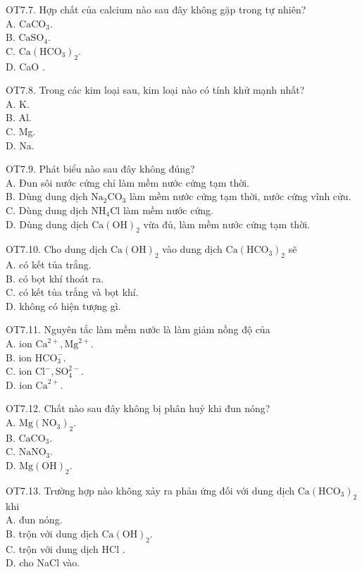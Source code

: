\documentclass[10pt]{article}
\begin{document}
OT7.7. Hợp chất của calcium nào sau đây không gặp trong tự nhiên?\\
A. $\mathrm{CaCO}_{3}$.\\
B. $\mathrm{CaSO}_{4}$.\\
C. $\mathrm{Ca}\left(\mathrm{HCO}_{3}\right)_{2}$.\\
D. CaO .

OT7.8. Trong các kim loại sau, kim loại nào có tính khử mạnh nhất?\\
A. K.\\
B. Al.\\
C. Mg.\\
D. Na.

OT7.9. Phát biểu nào sau đây không đúng?\\
A. Đun sôi nước cứng chỉ làm mềm nước cứng tạm thời.\\
B. Dùng dung dịch $\mathrm{Na}_{2} \mathrm{CO}_{3}$ làm mềm nước cứng tạm thời, nước cứng vĩnh cửu.\\
C. Dùng dung dịch $\mathrm{NH}_{4} \mathrm{Cl}$ làm mềm nước cứng.\\
D. Dùng dung dịch $\mathrm{Ca}(\mathrm{OH})_{2}$ vừa đủ, làm mềm nước cứng tạm thời.

OT7.10. Cho dung dịch $\mathrm{Ca}(\mathrm{OH})_{2}$ vào dung dịch $\mathrm{Ca}\left(\mathrm{HCO}_{3}\right)_{2}$ sẽ\\
A. có kết tủa trắng.\\
B. có bọt khí thoát ra.\\
C. có kết tủa trắng và bọt khí.\\
D. không có hiện tượng gì.

OT7.11. Nguyên tắc làm mềm nước là làm giảm nồng độ của\\
A. ion $\mathrm{Ca}^{2+}, \mathrm{Mg}^{2+}$.\\
B. ion $\mathrm{HCO}_{3}^{-}$.\\
C. ion $\mathrm{Cl}^{-}, \mathrm{SO}_{4}^{2-}$.\\
D. ion $\mathrm{Ca}^{2+}$.

OT7.12. Chất nào sau đây không bị phân huỷ khi đun nóng?\\
A. $\mathrm{Mg}\left(\mathrm{NO}_{3}\right)_{2}$.\\
B. $\mathrm{CaCO}_{3}$.\\
C. $\mathrm{NaNO}_{3}$.\\
D. $\mathrm{Mg}(\mathrm{OH})_{2}$.

OT7.13. Trường hợp nào không xảy ra phản ứng đối với dung dịch $\mathrm{Ca}\left(\mathrm{HCO}_{3}\right)_{2}$ khi\\
A. đun nóng.\\
B. trộn với dung dịch $\mathrm{Ca}(\mathrm{OH})_{2}$.\\
C. trộn với dung dịch HCl .\\
D. cho NaCl vào.
\end{document}
